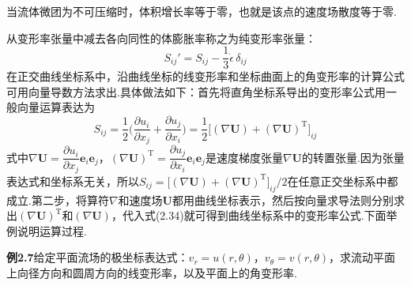 当流体微团为不可压缩时，体积增长率等于零，也就是该点的速度场散度等于零.

从变形率张量中减去各向同性的体膨胀率称之为纯变形率张量：
\[
S_{ij}'=S_{ij}-\frac{1}{3}\dot{\epsilon}\,\delta_{ij}
\]
在正交曲线坐标系中，沿曲线坐标的线变形率和坐标曲面上的角变形率的计算公式可用向量导数方法求出.具体做法如下：首先将直角坐标系导出的变形率公式用一般向量运算表达为
\begin{equation*}
S_{ij}=\frac{1}{2}\Big(\frac{\partial u_i}{\partial x_j}+\frac{\partial u_j}{\partial x_i}\Big)=\frac{1}{2}\big[(\nabla\boldsymbol{U})+(\nabla\boldsymbol{U})^{\mathrm{T}}\big]_{ij}
\tag{2.34}
\end{equation*}
式中$\nabla\boldsymbol{U}=\dfrac{\partial u_i}{\partial x_j}\boldsymbol{e}_i\boldsymbol{e}_j$，$(\nabla\boldsymbol{U})^{\mathrm{T}}=\dfrac{\partial u_j}{\partial x_i}\boldsymbol{e}_i\boldsymbol{e}_j$是速度梯度张量$\nabla\boldsymbol{U}$的转置张量.因为张量表达式和坐标系无关，所以$S_{ij}=\big[(\nabla\boldsymbol{U})+(\nabla\boldsymbol{U})^{\mathrm{T}}\big]_{ij}/2$在任意正交坐标系中都成立.第二步，将算符$\nabla$和速度场$\boldsymbol{U}$都用曲线坐标表示，然后按向量求导法则分别求出$(\nabla\boldsymbol{U})^{\mathrm{T}}$和$(\nabla\boldsymbol{U})$，代入式(2.34)就可得到曲线坐标系中的变形率公式.下面举例说明运算过程.

\noindent\textbf{例2.7}\quad 给定平面流场的极坐标表达式：$v_r=u(r,\theta)$，$v_\theta=v(r,\theta)$，求流动平面上向径方向和圆周方向的线变形率，以及平面上的角变形率.

